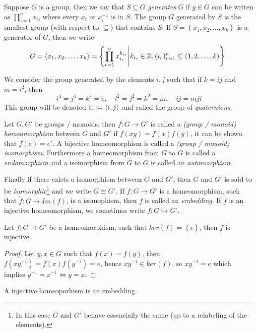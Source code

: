 Suppose $G$ is a group, then we say that $S \subseteq G$ \textit{generates} $G$ if $g \in G$ can be writen as $\prod^n_{i = 1} x_i$, where every $x_i$ or $x_i^{-1}$ is in $S$. The group $G$ generated by $S$ is the smallest group (with respect to $\subseteq$) that contains $S$. If $S = \left\{x_1, x_2, \ldots, x_{k}\right\}$ is a generator of $G$, then we write
\begin{equation*}
  G = \langle x_1, x_2, \ldots, x_{k}\rangle = \left\{\prod_{r = 1}^n x_{i_r}^{k_{i_{r}}} \middle| k_{i_r} \in \mathbb{Z}, (i_r)_{r = 1}^n \subseteq (1, 2, \ldots, k)\right\}.
\end{equation*}

\begin{example}\label{exmp:quaternion_group}
  We consider the group generated by the elements $i, j$ such that if $k = ij$ and $m = i^2$, then
  \begin{equation*}
    i^4 = j^4 = k^4 = e, \quad i^2 = j^2 = k^2 = m, \quad ij = mji
  \end{equation*}
  This group will be denoted $\mathbb{H} := \langle i, j\rangle$ and called the group of \textit{quaternions}.
\end{example}
Let $G, G'$ be groups / monoids, then $f: G \to G'$ is called a \textit{(group / monoid) homeomorphism} between $G$ and $G'$ if $f(xy) = f(x)f(y)$, it can be shown that $f(e) = e'$. A bijective homeomorphism is called a \textit{(group / monoid) isomorphism}. Furthermore a homeomorphism from $G$ to $G$ is called a \textit{endomorphism} and a isomorphism from $G$ to $G$ is called an \textit{automorphism}.

Finally if there exists a isomorphism between $G$ and $G'$, then $G$ and $G'$ is said to be \textit{isomorphic}\footnote{In this case $G$ and $G'$ behave essencially the same (up to a relabeling of the elements).} and we write $G \cong G'$.
If $f: G \to G'$ is a homeomorphism, such that $\tilde{f}: G \to Im(f)$, is a isomophism, then $f$ is called an \textit{embedding}. If $f$ is an injective homeomorphism, we sometimes write $f: G \hookrightarrow G'$.

\begin{proposition}\label{prop:}
  Let $f: G \to G'$ be a homeomorphism, such that $ker(f) = \left\{e\right\}$, then $f$ is injective.
\end{proposition}
\begin{proof}
Let $y, x \in G$ such that $f(x) = f(y)$, then $f(xy^{-1}) = f(x) f(y^{-1}) = e$, hence $x y^{-1} \in ker(f)$, so $x y^{-1} = e$ which implies $y^{-1} = x^{-1} \iff y = x$.
\end{proof}
\begin{remark}
  A injective homeoporhism is an embedding.
\end{remark}

